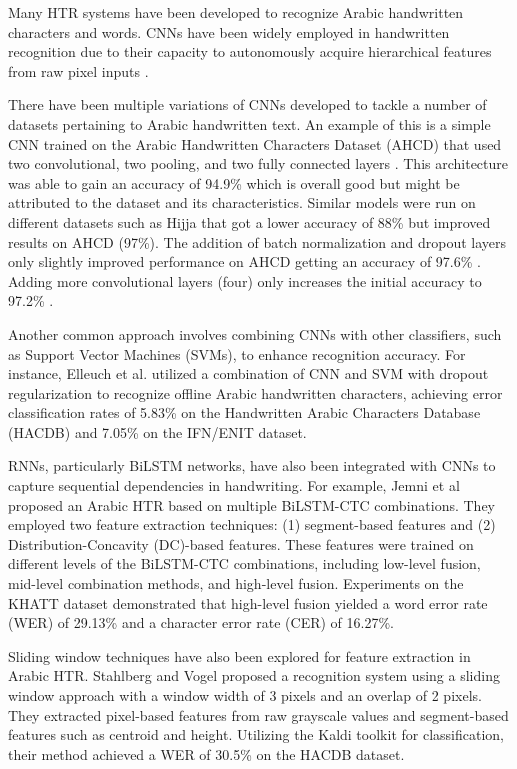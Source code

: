 \documentclass[conference]{IEEEtran}
\begin{document}
Many HTR systems have been developed to recognize Arabic handwritten characters and words. CNNs have been widely employed in handwritten recognition due to their capacity to autonomously acquire hierarchical features from raw pixel inputs \cite{alrobah2022arabic}.

There have been multiple variations of CNNs developed to tackle a number of datasets pertaining to Arabic handwritten text. An example of this is a simple CNN trained on the Arabic Handwritten Characters Dataset (AHCD) that used two convolutional, two pooling, and two fully connected layers \cite{el2017arabic}. This architecture was able to gain an accuracy of 94.9\% which is overall good but might be attributed to the dataset and its characteristics. Similar models were run on different datasets such as Hijja \cite{altwaijry2021arabic} that got a lower accuracy of 88\% but improved results on AHCD (97\%). The addition of batch normalization and dropout layers only slightly improved performance on AHCD getting an accuracy of 97.6\% \cite{younis2017arabic}. Adding more convolutional layers (four) only increases the initial accuracy to 97.2\% \cite{najadat2019arabic}. 


Another common approach involves combining CNNs with other classifiers, such as Support Vector Machines (SVMs), to enhance recognition accuracy. For instance, Elleuch et al. \cite{elleuch2016new} utilized a combination of CNN and SVM with dropout regularization to recognize offline Arabic handwritten characters, achieving error classification rates of 5.83\% on the Handwritten Arabic Characters Database (HACDB) and 7.05\% on the IFN/ENIT dataset.

RNNs, particularly BiLSTM networks, have also been integrated with CNNs to capture sequential dependencies in handwriting. For example, Jemni et al \cite{jemni2018offline} proposed an Arabic HTR based on multiple BiLSTM-CTC combinations. They employed two feature extraction techniques: (1) segment-based features and (2) Distribution-Concavity (DC)-based features. These features were trained on different levels of the BiLSTM-CTC combinations, including low-level fusion, mid-level combination methods, and high-level fusion. Experiments on the KHATT dataset demonstrated that high-level fusion yielded a word error rate (WER) of 29.13\% and a character error rate (CER) of 16.27\%.

Sliding window techniques have also been explored for feature extraction in Arabic HTR. Stahlberg and Vogel \cite{stahlberg2015qcri} proposed a recognition system using a sliding window approach with a window width of 3 pixels and an overlap of 2 pixels. They extracted pixel-based features from raw grayscale values and segment-based features such as centroid and height. Utilizing the Kaldi toolkit for classification, their method achieved a WER of 30.5\% on the HACDB dataset.
\end{document}
